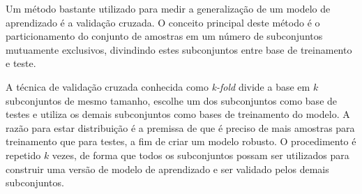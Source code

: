 %
%

Um método bastante utilizado para medir a generalização de um modelo de aprendizado é a validação cruzada. O conceito principal deste método é o particionamento do conjunto de amostras em um número de subconjuntos mutuamente exclusivos, divindindo estes subconjuntos entre base de treinamento e teste.

A técnica de validação cruzada conhecida como \textit{k-fold} divide a base em $k$ subconjuntos de mesmo tamanho, escolhe um dos subconjuntos como base de testes e utiliza os demais subconjuntos como bases de treinamento do modelo. A razão para estar distribuição é a premissa de que é preciso de mais amostras para treinamento que para testes, a fim de criar um modelo robusto. O procedimento é repetido $k$ vezes, de forma que todos os subconjuntos possam ser utilizados para construir uma versão de modelo de aprendizado e ser validado pelos demais subconjuntos.

%
%

